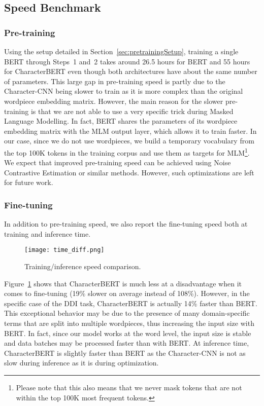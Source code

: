 \documentclass[11pt]{article}
\begin{document}
\subsection{Speed Benchmark}
\subsubsection{Pre-training}
Using the setup detailed in Section~\ref{sec:pretrainingSetup}, training a single BERT through Steps~1 and~2 takes around 26.5 hours for BERT and 55 hours for CharacterBERT even though both architectures have about the same number of parameters. This large gap in pre-training speed is partly due to the Character-CNN being slower to train as it is more complex than the original wordpiece embedding matrix. However, the main reason for the slower pre-training is that we are not able to use a very specific trick during Masked Language Modelling. In fact, BERT shares the parameters of its wordpiece embedding matrix with the MLM output layer, which allows it to train faster. In our case, since we do not use wordpieces, we build a temporary vocabulary from the top 100K tokens in the training corpus and use them as targets for MLM\footnote{Please note that this also means that we never mask tokens that are not within the top 100K most frequent tokens.}. We expect that improved pre-training speed can be achieved using Noise Contrastive Estimation \cite{mnih2013learning} or similar methods. However, such optimizations are left for future work.

\subsubsection{Fine-tuning}

In addition to pre-training speed, we also report the fine-tuning speed both at training and inference time.

\begin{figure}[htbp]
\begin{center} 
\texttt{[image: time\_diff.png]}
\end{center} 
\caption{Training/inference speed comparison.} \label{timeDiff}
\end{figure}

Figure~\ref{timeDiff} shows that CharacterBERT is much less at a disadvantage when it comes to fine-tuning (19\% slower on average instead of 108\%). However, in the specific case of the DDI task, CharacterBERT is actually 14\% faster than BERT. This exceptional behavior may be due to the presence of many domain-specific terms that are split into multiple wordpieces, thus increasing the input size with BERT. In fact, since our model works at the word level, the input size is stable and data batches may be processed faster than with BERT. At inference time, CharacterBERT is slightly faster than BERT as the Character-CNN is not as slow during inference as it is during optimization. 
\end{document}
